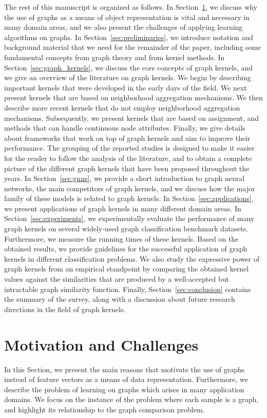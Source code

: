 \documentclass[twoside,11pt]{article}
\begin{document}
The rest of this manuscript is organized as follows.
In Section~\ref{sec:motivation_challenges}, we discuss why the use of graphs as a means of object representation is vital and necessary in many domain areas, and we also present the challenges of applying learning algorithms on graphs.
In Section~\ref{sec:preliminaries}, we introduce notation and background material that we need for the remainder of the paper, including some fundamental concepts from graph theory and from kernel methods.
In Section~\ref{sec:graph_kernels}, we discuss the core concepts of graph kernels, and we give an overview of the literature on graph kernels.
We begin by describing important kernels that were developed in the early days of the field.
We next present kernels that are based on neighborhood aggregation mechanisms.
We then describe more recent kernels that do not employ neighborhood aggregation mechanisms.
Subsequently, we present kernels that are based on assignment, and methods that can handle continuous node attributes.
Finally, we give details about frameworks that work on top of graph kernels and aim to improve their performance.
The grouping of the reported studies is designed to make it easier for the reader to follow the analysis of the literature, and to obtain a complete picture of the different graph kernels that have been proposed throughout the years.
In Section~\ref{sec:gnns}, we provide a short introduction to graph neural networks, the main competitors of graph kernels, and we discuss how the major family of these models is related to graph kernels.
In Section~\ref{sec:applications}, we present applications of graph kernels in many different domain areas.
In Section~\ref{sec:experiments}, we experimentally evaluate the performance of many graph kernels on several widely-used graph classification benchmark datasets.
Furthermore, we measure the running times of these kernels.
Based on the obtained results, we provide guidelines for the successful application of graph kernels in different classification problems.
We also study the expressive power of graph kernels from an empirical standpoint by comparing the obtained kernel values against the similarities that are produced by a well-accepted but intractable graph similarity function.
Finally, Section~\ref{sec:conclusion} contains the summary of the survey, along with a discussion about future research directions in the field of graph kernels.

\section{Motivation and Challenges}\label{sec:motivation_challenges}
In this Section, we present the main reasons that motivate the use of graphs instead of feature vectors as a means of data representation.
Furthermore, we describe the problem of learning on graphs which arises in many application domains.
We focus on the instance of the problem where each sample is a graph, and highlight its relationship to the graph comparison problem.
\end{document}
